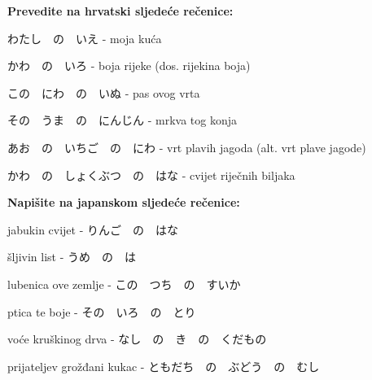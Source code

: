 
\author{Katja Kržišnik, Marko Barbančić}

	
	\normalsize \textbf{Prevedite na hrvatski sljedeće rečenice:}	
	
	\begin{mondai}{}
		\item わたし　の　いえ - moja kuća
		\item かわ　の　いろ - boja rijeke (dos. rijekina boja)

		\item この　にわ　の　いぬ - pas ovog vrta
		\item その　うま　の　にんじん - mrkva tog konja

		\item あお　の　いちご　の　にわ - vrt plavih jagoda (alt. vrt plave jagode)
		\item かわ　の　しょくぶつ　の　はな - cvijet riječnih biljaka
	\end{mondai}
	
	\normalsize \textbf{Napišite na japanskom sljedeće rečenice:}	
	
	\begin{mondai}{}
		\item jabukin cvijet - りんご　の　はな
		\item šljivin list - うめ　の　は

		\item lubenica ove zemlje - この　つち　の　すいか
		\item ptica te boje - その　いろ　の　とり

		\item voće kruškinog drva - なし　の　き　の　くだもの
		\item prijateljev grožđani kukac - ともだち　の　ぶどう　の　むし
	\end{mondai}

